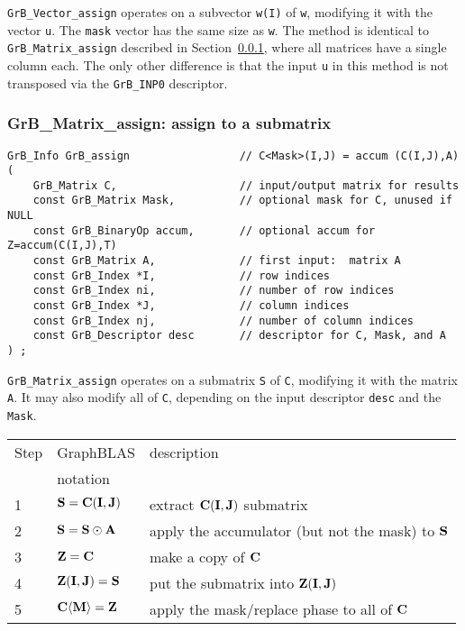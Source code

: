 \documentclass[12pt]{article}
\begin{document}
\verb'GrB_Vector_assign' operates on a subvector \verb'w(I)' of \verb'w',
modifying it with the vector \verb'u'.  The \verb'mask' vector has the same
size as \verb'w'.  The method is identical to \verb'GrB_Matrix_assign'
described in Section~\ref{assign_matrix}, where all matrices have a single
column each.  The only other difference is that the input \verb'u' in this
method is not transposed via the \verb'GrB_INP0' descriptor.

\newpage
\subsubsection{{\sf GrB\_Matrix\_assign:} assign to a submatrix }
\label{assign_matrix}

\begin{mdframed}[userdefinedwidth=6in]
{\footnotesize
\begin{verbatim}
GrB_Info GrB_assign                 // C<Mask>(I,J) = accum (C(I,J),A)
(
    GrB_Matrix C,                   // input/output matrix for results
    const GrB_Matrix Mask,          // optional mask for C, unused if NULL
    const GrB_BinaryOp accum,       // optional accum for Z=accum(C(I,J),T)
    const GrB_Matrix A,             // first input:  matrix A
    const GrB_Index *I,             // row indices
    const GrB_Index ni,             // number of row indices
    const GrB_Index *J,             // column indices
    const GrB_Index nj,             // number of column indices
    const GrB_Descriptor desc       // descriptor for C, Mask, and A
) ;
\end{verbatim} } \end{mdframed}

\verb'GrB_Matrix_assign' operates on a submatrix \verb'S' of \verb'C',
modifying it with the matrix \verb'A'.  It may also modify all of \verb'C',
depending on the input descriptor \verb'desc' and the \verb'Mask'.

\vspace{0.1in}
\begin{tabular}{lll}
\hline
Step & GraphBLAS & description \\
     & notation  & \\
\hline
1 & ${\bf S} = {\bf C(I,J)}$                & extract ${\bf C(I,J)}$ submatrix \\
2 & ${\bf S} = {\bf S} \odot {\bf A}$       & apply the accumulator (but not the mask) to ${\bf S}$\\
3 & ${\bf Z} = {\bf C}$                     & make a copy of ${\bf C}$ \\
4 & ${\bf Z(I,J)} = {\bf S}$                & put the submatrix into ${\bf Z(I,J)}$ \\
5 & ${\bf C \langle M \rangle = Z}$         & apply the mask/replace phase to all of ${\bf C}$ \\
\hline
\end{tabular}
\vspace{0.1in}
\end{document}
